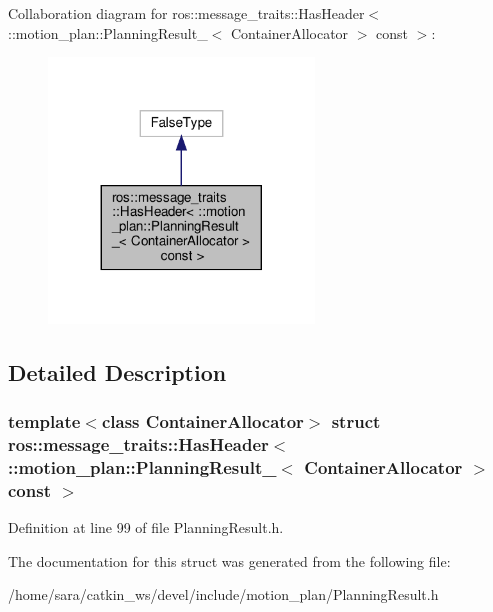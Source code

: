 Collaboration diagram for ros\+:\+:message\+\_\+traits\+:\+:Has\+Header$<$ \+:\+:motion\+\_\+plan\+:\+:Planning\+Result\+\_\+$<$ Container\+Allocator $>$ const $>$\+:
\nopagebreak
\begin{figure}[H]
\begin{center}
\leavevmode
\includegraphics[width=200pt]{structros_1_1message__traits_1_1HasHeader_3_01_1_1motion__plan_1_1PlanningResult___3_01Container209079b1e923088aed808cc9f4350759}
\end{center}
\end{figure}


\subsection{Detailed Description}
\subsubsection*{template$<$class Container\+Allocator$>$\newline
struct ros\+::message\+\_\+traits\+::\+Has\+Header$<$ \+::motion\+\_\+plan\+::\+Planning\+Result\+\_\+$<$ Container\+Allocator $>$ const $>$}



Definition at line 99 of file Planning\+Result.\+h.



The documentation for this struct was generated from the following file\+:\begin{DoxyCompactItemize}
\item 
/home/sara/catkin\+\_\+ws/devel/include/motion\+\_\+plan/Planning\+Result.\+h\end{DoxyCompactItemize}

